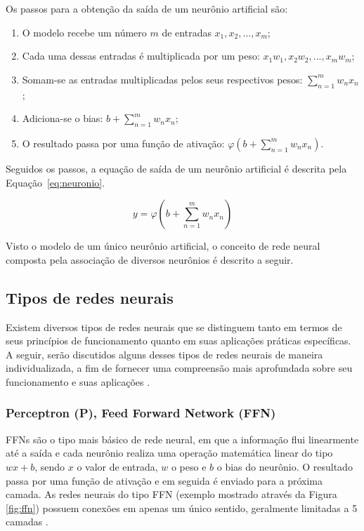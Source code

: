 Os passos para a obtenção da saída de um neurônio artificial são:

\begin{enumerate}
    \item O modelo recebe um número $m$ de entradas $x_1, x_2, ..., x_m$;
    \item Cada uma dessas entradas é multiplicada por um peso: $x_1w_1, x_2w_2, ..., x_mw_m$;
    \item Somam-se as entradas multiplicadas pelos seus respectivos pesos: $\sum_{n=1}^{m} w_n x_n$;
    \item Adiciona-se o bias: $b + \sum_{n=1}^{m} w_n x_n$;
    \item O resultado passa por uma função de ativação: $\varphi \left( b + \sum_{n=1}^{m} w_n x_n \right)$.
\end{enumerate}

Seguidos os passos, a equação de saída de um neurônio artificial é descrita pela Equação~\ref{eq:neuronio}.

\begin{equation}
    y = \varphi \left( b + \sum_{n=1}^{m} w_n x_n \right)
    \label{eq:neuronio}
\end{equation}

Visto o modelo de um único neurônio artificial, o conceito de rede neural composta pela associação de diversos neurônios é descrito a seguir.

\subsection{Tipos de redes neurais}

Existem diversos tipos de redes neurais que se distinguem tanto em termos de seus princípios de funcionamento quanto em suas aplicações práticas específicas. A seguir, serão discutidos alguns desses tipos de redes neurais de maneira individualizada, a fim de fornecer uma compreensão mais aprofundada sobre seu funcionamento e suas aplicações \cite{alex2020}.

\subsubsection{Perceptron (P), Feed Forward Network (FFN)}

FFNs são o tipo mais básico de rede neural, em que a informação flui linearmente até a saída e cada neurônio realiza uma operação matemática linear do tipo $wx + b$, sendo $x$ o valor de entrada, $w$ o peso e $b$ o bias do neurônio. O resultado passa por uma função de ativação e em seguida é enviado para a próxima camada. As redes neurais do tipo FFN (exemplo mostrado através da Figura \ref{fig:ffn}) possuem conexões em apenas um único sentido, geralmente limitadas a 5 camadas \cite{alex2020}.

